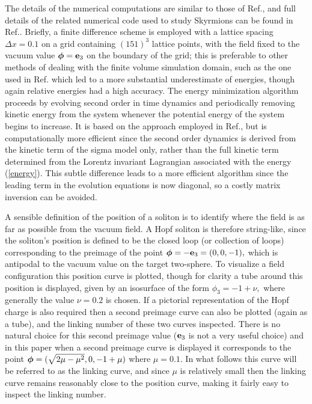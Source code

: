 \documentclass[12pt]{article}
\newcommand{\bphi}{\mbox{\boldmath $\phi$}}
\begin{document}
The details of the numerical computations are similar to those of
Ref.\cite{BS5}, and full details of the related numerical code used
to study Skyrmions can be found in Ref.\cite{BS3}. Briefly, a finite
difference scheme is employed with a lattice spacing $\Delta x=0.1$
on a grid containing  $(151)^3$ lattice points, with the field fixed
to the vacuum value $\bphi={\bf e}_3$ on the boundary of the grid;
this is preferable to other methods of dealing with the finite
volume simulation domain, such as the one used in Ref.\cite{BS5}
which led to a more substantial underestimate of energies, though
again relative energies had a high accuracy. The energy minimization
algorithm proceeds by evolving second order in time dynamics and
periodically removing kinetic energy from the system whenever the
potential energy of the system begins to increase. It is based on
the approach employed in Ref.\cite{BS5}, but is computationally more
efficient since the second order dynamics is derived from  the
kinetic term of the sigma model only, rather than the full kinetic
term determined from the Lorentz invariant Lagrangian associated
with the energy (\ref{energy}). This subtle difference leads to a
more efficient algorithm since the leading term in the evolution
equations is now diagonal, so a costly matrix inversion can be
avoided.

A sensible definition of the position of a soliton is to identify
where the field is as far as possible from the vacuum field. A Hopf
soliton is therefore string-like, since the soliton's position is
defined to be the closed loop (or collection of loops) corresponding
to the preimage of the point $\bphi=-{\bf e}_3=(0,0,-1),$ which is
antipodal to the vacuum value on the target two-sphere. To visualize
a field configuration this position curve is plotted, though for
clarity a tube around this position is displayed, given by an
isosurface of the form $\phi_3=-1+\nu,$ where generally the value
$\nu=0.2$ is chosen. If a pictorial representation of the Hopf
charge is also required then a second preimage curve can also be
plotted (again as a tube), and the linking number of these two
curves inspected. There is no natural choice for this second
preimage value (${\bf e}_3$ is not a very useful choice) and in this
paper when a second preimage curve is displayed it corresponds to
the point $\bphi=(\sqrt{2\mu-\mu^2},0,-1+\mu)$ where $\mu=0.1.$ In what
follows this curve will be referred to as the linking curve, and
since $\mu$ is relatively small then the linking curve remains
reasonably close to the position curve, making it fairly easy to
inspect the linking number.
\end{document}
